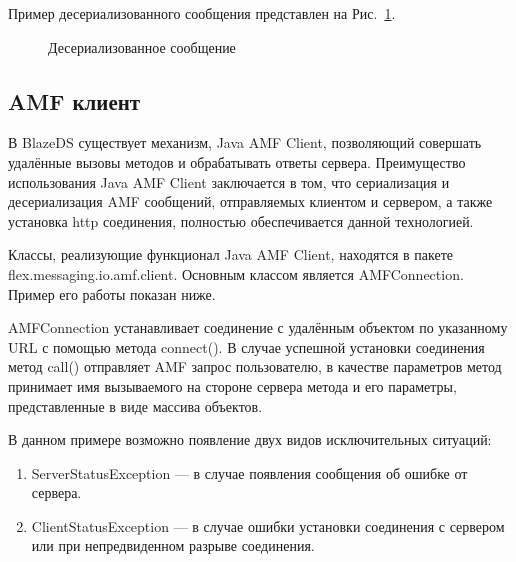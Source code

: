 Пример десериализованного сообщения представлен на Рис.~\ref{ris:deserialisedMessage.png}.

\begin{figure}[ht]
\caption{Десериализованное сообщение}
\label{ris:deserialisedMessage.png}
\end{figure} 

\subsection{AMF клиент}

В BlazeDS существует механизм, Java AMF Client, позволяющий совершать удалённые вызовы методов и обрабатывать ответы
сервера. Преимущество использования Java AMF Client заключается в том, что сериализация и десериализация AMF сообщений,
отправляемых клиентом и сервером, а также установка http соединения, полностью обеспечивается данной технологией.

Классы, реализующие функционал Java AMF Client, находятся в пакете flex.messaging.io.amf.client. Основным классом
является AMFConnection. Пример его работы показан ниже.



AMFConnection устанавливает соединение с удалённым объектом по указанному URL с помощью метода connect().
В случае успешной установки соединения метод call() отправляет AMF запрос пользователю, в качестве параметров метод
принимает имя вызываемого на стороне сервера метода и его параметры, представленные в виде массива объектов.

В данном примере возможно появление двух видов исключительных ситуаций:

\begin{enumerate}
\item ServerStatusException --- в случае появления сообщения об ошибке от сервера.
\item ClientStatusException --- в случае ошибки установки соединения с сервером или при непредвиденном разрыве
соединения.
\end{enumerate}

